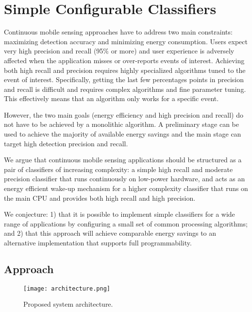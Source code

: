 \section{Simple Configurable Classifiers}
\label{sec:conjecture}

Continuous mobile sensing approaches have to address 
two main constraints: maximizing detection accuracy
and minimizing energy consumption.  Users expect very
high precision and recall (95\% or more) and user
experience is adversely affected when the application
misses or over-reports events of interest.  Achieving 
both high recall and precision requires 
highly specialized algorithms tuned to the event of 
interest.  Specifically, getting the last few percentages
points in precision and recall is difficult and requires
complex algorithms and fine parameter 
tuning.  This effectively means that an algorithm only
works for a specific event.

However, the two main goals (energy efficiency and high
precision and recall) do not have to be achieved by a 
monolithic algorithm.  A preliminary stage can be used
to achieve the majority of available energy savings and 
the main stage can target high detection precision and recall.

We argue that continuous mobile sensing applications should be
structured as a pair of classifiers of increasing complexity: a simple
high recall and moderate precision classifier that runs continuously
on low-power hardware, and acts as an energy efficient wake-up
mechanism for a higher complexity classifier that runs on the main CPU
and provides both high recall and high precision.

We conjecture: 1) that it is possible to implement simple classifiers for a 
wide range of applications by configuring a small set of common processing 
algorithms; and  2) that this approach will achieve comparable energy 
savings to an alternative implementation that supports full programmability.

\subsection {Approach}

\begin{figure}[t]
	\centering
	\texttt{[image: architecture.png]}
	\caption{Proposed system architecture.}
    \label{fig:architecture}
\end{figure}


